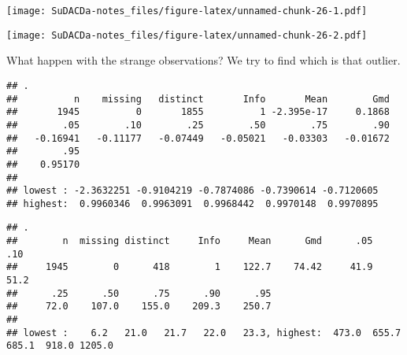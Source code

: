 \documentclass[]{book}
\newenvironment{Shaded}{\begin{snugshade}}{\end{snugshade}}
\newcommand{\KeywordTok}[1]{\textcolor[rgb]{0.13,0.29,0.53}{\textbf{{#1}}}}
\newcommand{\DataTypeTok}[1]{\textcolor[rgb]{0.13,0.29,0.53}{{#1}}}
\newcommand{\StringTok}[1]{\textcolor[rgb]{0.31,0.60,0.02}{{#1}}}
\newcommand{\CommentTok}[1]{\textcolor[rgb]{0.56,0.35,0.01}{\textit{{#1}}}}
\newcommand{\NormalTok}[1]{{#1}}
\theoremstyle{definition}
\theoremstyle{definition}
\theoremstyle{definition}
\theoremstyle{remark}
\begin{document}
\texttt{[image: SuDACDa-notes\_files/figure-latex/unnamed-chunk-26-1.pdf]}

\begin{Shaded}
\end{Shaded}

\texttt{[image: SuDACDa-notes\_files/figure-latex/unnamed-chunk-26-2.pdf]}

What happen with the strange observations? We try to find which is that
outlier.

\begin{Shaded}
\end{Shaded}

\begin{verbatim}
## . 
##          n    missing   distinct       Info       Mean        Gmd 
##       1945          0       1855          1 -2.395e-17     0.1868 
##        .05        .10        .25        .50        .75        .90 
##   -0.16941   -0.11177   -0.07449   -0.05021   -0.03303   -0.01672 
##        .95 
##    0.95170 
## 
## lowest : -2.3632251 -0.9104219 -0.7874086 -0.7390614 -0.7120605
## highest:  0.9960346  0.9963091  0.9968442  0.9970148  0.9970895
\end{verbatim}

\begin{Shaded}
\end{Shaded}

\begin{verbatim}
## . 
##        n  missing distinct     Info     Mean      Gmd      .05      .10 
##     1945        0      418        1    122.7    74.42     41.9     51.2 
##      .25      .50      .75      .90      .95 
##     72.0    107.0    155.0    209.3    250.7 
## 
## lowest :    6.2   21.0   21.7   22.0   23.3, highest:  473.0  655.7  685.1  918.0 1205.0
\end{verbatim}
\end{document}
